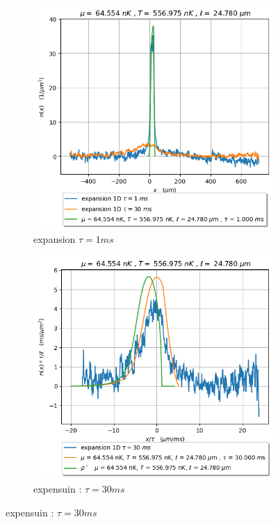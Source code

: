 \documentclass[a3, 10pt,twoside]{article}          %
\theoremstyle{plain}
\theoremstyle{definition}
\theoremstyle{remark}
\theoremstyle{definition} %
\begin{document}
\begin{figure}[ht]
    \vspace{1em}
    \begin{subfigure}[b]{0.45\textwidth}
        \centering
        \includegraphics[width=\textwidth]{Figures/simul_expansion_1_24-04-2024}
        \caption{expansion $\tau = 1ms$}
        \label{fig:sub4}
    \end{subfigure}
    \begin{subfigure}[b]{0.45\textwidth}
        \centering
        \includegraphics[width=\textwidth]{Figures/simul_expansion_30_24-04-2024}
        \caption{expensuin : $\tau = 30ms$}
        \label{fig:sub3}
    \end{subfigure}
    

\end{figure}
\end{document}
